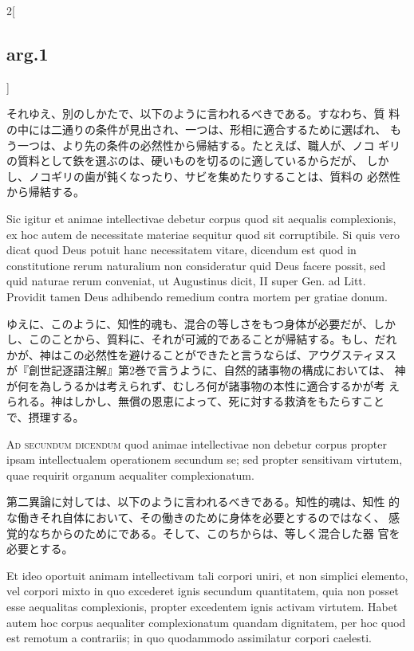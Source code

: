 \documentclass[paper=a4paper,fontsize=10pt,jafontsize=9pt,titlepage]{jlreq}
\begin{document}
\begin{paracol}{2}[\subsection{arg.1}]
\switchcolumn

 それゆえ、別のしかたで、以下のように言われるべきである。すなわち、質
 料の中には二通りの条件が見出され、一つは、形相に適合するために選ばれ、
 もう一つは、より先の条件の必然性から帰結する。たとえば、職人が、ノコ
 ギリの質料として鉄を選ぶのは、硬いものを切るのに適しているからだが、
 しかし、ノコギリの歯が鈍くなったり、サビを集めたりすることは、質料の
 必然性から帰結する。
 
\switchcolumn*


 Sic igitur et animae intellectivae debetur corpus quod sit aequalis
 complexionis, ex hoc autem de necessitate materiae sequitur quod sit
 corruptibile. Si quis vero dicat quod Deus potuit hanc necessitatem
 vitare, dicendum est quod in constitutione rerum naturalium non
 consideratur quid Deus facere possit, sed quid naturae rerum
 conveniat, ut Augustinus dicit, II super Gen. ad Litt. Providit tamen
 Deus adhibendo remedium contra mortem per gratiae donum.

\switchcolumn

ゆえに、このように、知性的魂も、混合の等しさをもつ身体が必要だが、しか
し、このことから、質料に、それが可滅的であることが帰結する。もし、だれ
かが、神はこの必然性を避けることができたと言うならば、アウグスティヌス
が『創世記逐語注解』第2巻で言うように、自然的諸事物の構成においては、
神が何を為しうるかは考えられず、むしろ何が諸事物の本性に適合するかが考
えられる。神はしかし、無償の恩恵によって、死に対する救済をもたらすこと
で、摂理する。
 
\switchcolumn*[\subsection{ad 2}]



 {\scshape Ad secundum dicendum} quod animae intellectivae non debetur
 corpus propter ipsam intellectualem operationem secundum se; sed
 propter sensitivam virtutem, quae requirit organum aequaliter
 complexionatum.

 \switchcolumn

 第二異論に対しては、以下のように言われるべきである。知性的魂は、知性
 的な働きそれ自体において、その働きのために身体を必要とするのではなく、
 感覚的なちからのためにである。そして、このちからは、等しく混合した器
 官を必要とする。

\switchcolumn*

 
 Et ideo oportuit animam intellectivam tali corpori uniri, et non
 simplici elemento, vel corpori mixto in quo excederet ignis secundum
 quantitatem, quia non posset esse aequalitas complexionis, propter
 excedentem ignis activam virtutem. Habet autem hoc corpus aequaliter
 complexionatum quandam dignitatem, per hoc quod est remotum a
 contrariis; in quo quodammodo assimilatur corpori caelesti.
 

\end{paracol}
\end{document}
